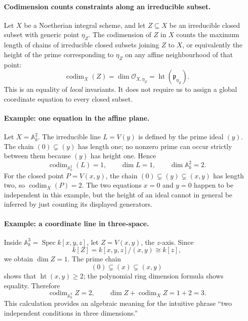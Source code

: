 \paragraph{Codimension counts constraints along an irreducible subset.}
Let \(X\) be a Noetherian integral scheme, and let
\(Z\subseteq X\) be an irreducible closed subset with generic point
\(\eta_Z\).  The codimension of \(Z\) in \(X\) counts the
maximum length of chains of irreducible closed subsets joining
\(Z\) to \(X\), or equivalently the height of the prime
corresponding to \(\eta_Z\) on any affine neighbourhood of that
point:
\[
 \operatorname{codim}_X(Z)
 =\dim\mathcal O_{X,\eta_Z}
 =\operatorname{ht}(\mathfrak p_{\eta_Z}).
\]
This is an equality of \emph{local} invariants.  It does not
require us to assign a global coordinate equation to every closed
subset.

\paragraph{Example: one equation in the affine plane.}
Let \(X=\mathbb A^2_k\).  The irreducible line
\(L=V(y)\) is defined by the prime ideal \((y)\).
The chain \((0)\subsetneq(y)\) has length one; no nonzero
prime can occur strictly between them because \((y)\) has
height one.  Hence
\[
 \operatorname{codim}_{\mathbb A^2_k}(L)=1,
 \qquad \dim L=1,
 \qquad \dim\mathbb A^2_k=2.
\]
For the closed point \(P=V(x,y)\), the chain
\((0)\subsetneq(y)\subsetneq(x,y)\) has length two,
so \(\operatorname{codim}_X(P)=2\).  The two equations
\(x=0\) and \(y=0\) happen to be independent in this example,
but the height of an ideal cannot in general be inferred by just
counting its displayed generators.

\paragraph{Example: a coordinate line in three-space.}
Inside \(\mathbb A^3_k=\operatorname{Spec}k[x,y,z]\), let
\(Z=V(x,y)\), the \(z\)-axis.  Since
\[
 k[Z]=k[x,y,z]/(x,y)\cong k[z],
\]
we obtain \(\dim Z=1\).  The prime chain
\[
 (0)\subsetneq(x)\subsetneq(x,y)
\]
shows that \(\operatorname{ht}(x,y)\ge2\); the polynomial
ring dimension formula shows equality.  Therefore
\[
 \operatorname{codim}_{\mathbb A^3_k}Z=2,
 \qquad \dim Z+\operatorname{codim}_X Z=1+2=3.
\]
This calculation provides an algebraic meaning for the intuitive
phrase ``two independent conditions in three dimensions.''

